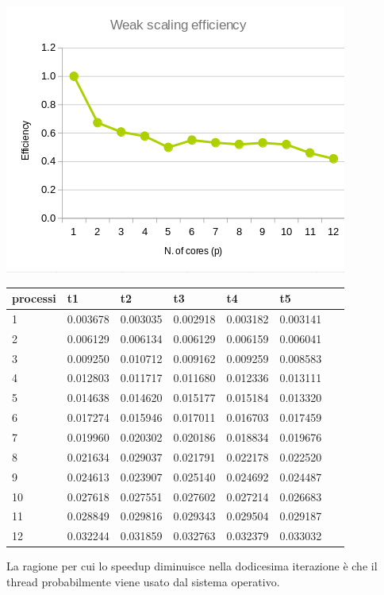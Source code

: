 \documentclass[a4paper,11pt, twoside]{report}
\begin{document}
\includegraphics[scale=0.5]{images/mpi_weak.png}
\begin{table}[!ht]
    \centering
    \begin{tabular}{|l|l|l|l|l|l|l|}
    \hline
        processi & t1 & t2 & t3 & t4 & t5 & ~ \\ \hline
        1 & 0.003678 & 0.003035 & 0.002918 & 0.003182 & 0.003141 & ~ \\ \hline
        2 & 0.006129 & 0.006134 & 0.006129 & 0.006159 & 0.006041 & ~ \\ \hline
        3 & 0.009250 & 0.010712 & 0.009162 & 0.009259 & 0.008583 & ~ \\ \hline
        4 & 0.012803 & 0.011717 & 0.011680 & 0.012336 & 0.013111 & ~ \\ \hline
        5 & 0.014638 & 0.014620 & 0.015177 & 0.015184 & 0.013320 & ~ \\ \hline
        6 & 0.017274 & 0.015946 & 0.017011 & 0.016703 & 0.017459 & ~ \\ \hline
        7 & 0.019960 & 0.020302 & 0.020186 & 0.018834 & 0.019676 & ~ \\ \hline
        8 & 0.021634 & 0.029037 & 0.021791 & 0.022178 & 0.022520 & ~ \\ \hline
        9 & 0.024613 & 0.023907 & 0.025140 & 0.024692 & 0.024487 & ~ \\ \hline
        10 & 0.027618 & 0.027551 & 0.027602 & 0.027214 & 0.026683 & ~ \\ \hline
        11 & 0.028849 & 0.029816 & 0.029343 & 0.029504 & 0.029187 & ~ \\ \hline
        12 & 0.032244 & 0.031859 & 0.032763 & 0.032379 & 0.033032 & ~ \\ \hline
    \end{tabular}
\end{table}
\newline
La ragione per cui lo speedup diminuisce nella dodicesima iterazione è che il thread probabilmente viene usato dal sistema operativo.
\end{document}
